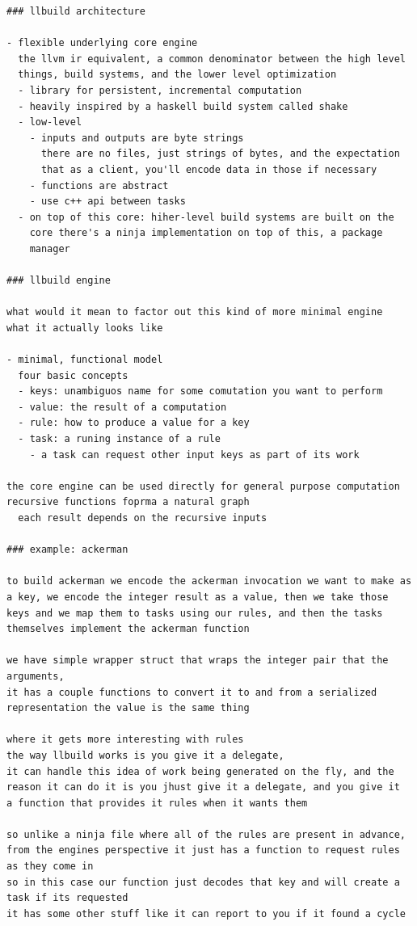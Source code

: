 \documentclass[12pt, a4paper]{report}
\begin{document}
\begin{verbatim}
### llbuild architecture

- flexible underlying core engine
  the llvm ir equivalent, a common denominator between the high level
  things, build systems, and the lower level optimization
  - library for persistent, incremental computation
  - heavily inspired by a haskell build system called shake
  - low-level
    - inputs and outputs are byte strings
      there are no files, just strings of bytes, and the expectation
      that as a client, you'll encode data in those if necessary
    - functions are abstract
    - use c++ api between tasks
  - on top of this core: hiher-level build systems are built on the
    core there's a ninja implementation on top of this, a package
    manager

### llbuild engine

what would it mean to factor out this kind of more minimal engine
what it actually looks like

- minimal, functional model
  four basic concepts
  - keys: unambiguos name for some comutation you want to perform
  - value: the result of a computation
  - rule: how to produce a value for a key
  - task: a runing instance of a rule
    - a task can request other input keys as part of its work

the core engine can be used directly for general purpose computation
recursive functions foprma a natural graph
  each result depends on the recursive inputs

### example: ackerman

to build ackerman we encode the ackerman invocation we want to make as
a key, we encode the integer result as a value, then we take those
keys and we map them to tasks using our rules, and then the tasks
themselves implement the ackerman function

we have simple wrapper struct that wraps the integer pair that the
arguments,
it has a couple functions to convert it to and from a serialized
representation the value is the same thing

where it gets more interesting with rules
the way llbuild works is you give it a delegate,
it can handle this idea of work being generated on the fly, and the
reason it can do it is you jhust give it a delegate, and you give it
a function that provides it rules when it wants them

so unlike a ninja file where all of the rules are present in advance,
from the engines perspective it just has a function to request rules
as they come in
so in this case our function just decodes that key and will create a
task if its requested
it has some other stuff like it can report to you if it found a cycle


\end{verbatim}
\end{document}
